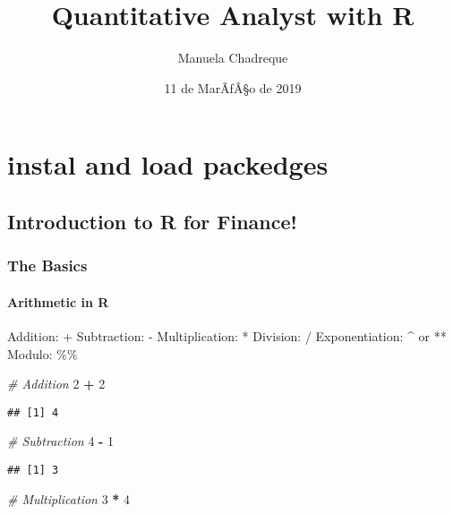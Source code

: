 \documentclass[]{article}
\title{Quantitative Analyst with R}
\author{Manuela Chadreque}
\date{11 de MarÃfÂ§o de 2019}
\newenvironment{Shaded}{\begin{snugshade}}{\end{snugshade}}
\newcommand{\DecValTok}[1]{\textcolor[rgb]{0.00,0.00,0.81}{#1}}
\newcommand{\StringTok}[1]{\textcolor[rgb]{0.31,0.60,0.02}{#1}}
\newcommand{\CommentTok}[1]{\textcolor[rgb]{0.56,0.35,0.01}{\textit{#1}}}
\newcommand{\OperatorTok}[1]{\textcolor[rgb]{0.81,0.36,0.00}{\textbf{#1}}}
\let\oldparagraph\paragraph
\renewcommand{\paragraph}[1]{\oldparagraph{#1}\mbox{}}
\begin{document}
\maketitle

\section{instal and load packedges}\label{instal-and-load-packedges}

\subsection{Introduction to R for
Finance!}\label{introduction-to-r-for-finance}

\subsubsection{The Basics}\label{the-basics}

\paragraph{Arithmetic in R}\label{arithmetic-in-r}

Addition: + Subtraction: - Multiplication: * Division: / Exponentiation:
\^{} or ** Modulo: \%\%

\begin{Shaded}
\begin{Highlighting}[]
\CommentTok{# Addition }
\DecValTok{2} \OperatorTok{+}\StringTok{ }\DecValTok{2}
\end{Highlighting}
\end{Shaded}

\begin{verbatim}
## [1] 4
\end{verbatim}

\begin{Shaded}
\begin{Highlighting}[]
\CommentTok{# Subtraction}
\DecValTok{4} \OperatorTok{-}\StringTok{ }\DecValTok{1}
\end{Highlighting}
\end{Shaded}

\begin{verbatim}
## [1] 3
\end{verbatim}

\begin{Shaded}
\begin{Highlighting}[]
\CommentTok{# Multiplication}
\DecValTok{3} \OperatorTok{*}\StringTok{ }\DecValTok{4}
\end{Highlighting}
\end{Shaded}
\end{document}
